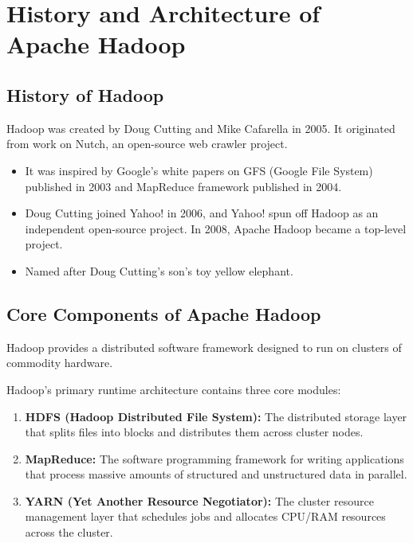 \documentclass[12pt,a4paper]{article}
\begin{document}
\section{History and Architecture of Apache Hadoop}

\subsection{History of Hadoop}
Hadoop was created by Doug Cutting and Mike Cafarella in 2005. It originated from work on Nutch, an open-source web crawler project.
\begin{itemize}[leftmargin=*, itemsep=3pt]
  \item It was inspired by Google's white papers on GFS (Google File System) published in 2003 and MapReduce framework published in 2004.
  \item Doug Cutting joined Yahoo! in 2006, and Yahoo! spun off Hadoop as an independent open-source project. In 2008, Apache Hadoop became a top-level project.
  \item Named after Doug Cutting's son's toy yellow elephant.
\end{itemize}

\subsection{Core Components of Apache Hadoop}
Hadoop provides a distributed software framework designed to run on clusters of commodity hardware.

\begin{tcolorbox}[formulabox, title={Core Hadoop Modules}]
  Hadoop's primary runtime architecture contains three core modules:
  \begin{enumerate}[leftmargin=*, noitemsep]
    \item \textbf{HDFS (Hadoop Distributed File System):} The distributed storage layer that splits files into blocks and distributes them across cluster nodes.
    \item \textbf{MapReduce:} The software programming framework for writing applications that process massive amounts of structured and unstructured data in parallel.
    \item \textbf{YARN (Yet Another Resource Negotiator):} The cluster resource management layer that schedules jobs and allocates CPU/RAM resources across the cluster.
  \end{enumerate}
\end{tcolorbox}
\end{document}

